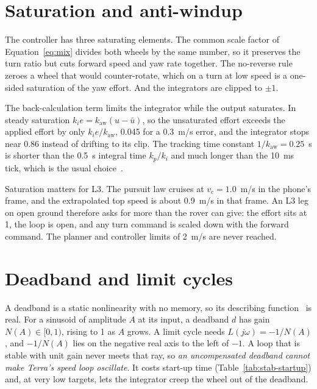 \section{Saturation and anti-windup}
\label{sec:stab-saturation}

The controller has three saturating elements.
The common scale factor of Equation~\eqref{eq:mix} divides both wheels by the same number, so it preserves the turn ratio but cuts forward speed and yaw rate together.
The no-reverse rule zeroes a wheel that would counter-rotate, which on a turn at low speed is a one-sided saturation of the yaw effort.
And the integrators are clipped to $\pm 1$.

The back-calculation term limits the integrator while the output saturates.
In steady saturation $k_i e = k_{\text{aw}}(u - \bar u)$, so the unsaturated effort exceeds the applied effort by only $k_i e / k_{\text{aw}}$, 0.045 for a 0.3~m/s error, and the integrator stops near 0.86 instead of drifting to its clip.
The tracking time constant $1/k_{\text{aw}} = 0.25$~s is shorter than the 0.5~s integral time $k_p/k_i$ and much longer than the 10~ms tick, which is the usual choice~\citep{astrom2006advanced}.

Saturation matters for L3.
The pursuit law cruises at $v_c = 1.0$~m/s in the phone's frame, and the extrapolated top speed is about 0.9~m/s in that frame.
An L3 leg on open ground therefore asks for more than the rover can give: the effort sits at 1, the loop is open, and any turn command is scaled down with the forward command.
The planner and controller limits of 2~m/s are never reached.

\section{Deadband and limit cycles}
\label{sec:stab-deadband}

A deadband is a static nonlinearity with no memory, so its describing function~\citep{slotine1991applied} is real.
For a sinusoid of amplitude $A$ at its input, a deadband $d$ has gain $N(A) \in [0, 1)$, rising to 1 as $A$ grows.
A limit cycle needs $L(j\omega) = -1/N(A)$, and $-1/N(A)$ lies on the negative real axis to the left of $-1$.
A loop that is stable with unit gain never meets that ray, so \emph{an uncompensated deadband cannot make Terra's speed loop oscillate}.
It costs start-up time (Table~\ref{tab:stab-startup}) and, at very low targets, lets the integrator creep the wheel out of the deadband.

